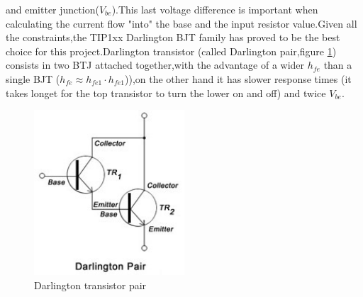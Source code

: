 and emitter junction($V_{be}$).This last voltage difference is important when calculating the current flow "into" the base and the input resistor value.Given all the constraints,the TIP1xx Darlington BJT family has proved to be the best choice for this project.Darlington transistor (called Darlington pair,figure \ref{fig:darlington}) consists in two BTJ attached together,with the advantage of a wider $h_{fe}$ than a single BJT ($h_{fe}\approx h_{fe1}\cdot h_{fe1}$)),on the other hand it has slower response times (it takes longet for the top transistor to turn the lower on and off) and twice $V_{be}$.

\begin{figure}[!ht]
	\centering
	\includegraphics[width=0.5\textwidth]{figures/Darlingtonpair}
	\caption{Darlington transistor pair}
	\label{fig:darlington}
\end{figure}

